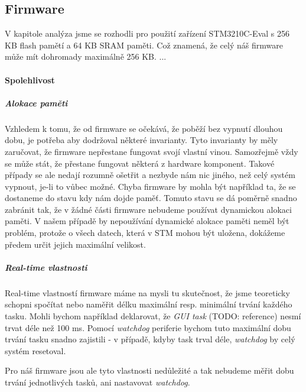 
\subsection{Firmware}

V kapitole analýza jsme se rozhodli pro použití zařízení STM3210C-Eval s 256 KB flash pamětí
a 64 KB SRAM paměti.
Což znamená, že celý náš firmware může mít dohromady maximálně 256 KB.
...

\paragraph{Spolehlivost}

\subparagraph{Alokace paměti}
Vzhledem k tomu, že od firmware se očekává, že poběží bez vypnutí dlouhou dobu, je potřeba aby
dodržoval některé invarianty.
Tyto invarianty by měly zaručovat, že firmware nepřestane fungovat svojí vlastní vinou.
Samozřejmě vždy se může stát, že přestane fungovat některá z hardware komponent.
Takové případy se ale nedají rozumně ošetřit a nezbyde nám nic jiného, než celý systém vypnout,
je-li to vůbec možné.
Chyba firmware by mohla být například ta, že se dostaneme do stavu kdy nám dojde paměť.
Tomuto stavu se dá poměrně snadno zabránit tak, že v žádné části firmware nebudeme používat
dynamickou alokaci paměti.
V našem případě by nepoužívání dynamické alokace paměti neměl být problém, protože o všech datech,
která v STM mohou být uložena, dokážeme předem určit jejich maximální velikost.

\subparagraph{Real-time vlastnosti}
Real-time vlastností firmware máme na mysli tu skutečnost, že jsme teoreticky schopni spočítat nebo
naměřit délku maximální resp. minimální trvání každého tasku.
Mohli bychom například deklarovat, že \emph{GUI task} (TODO: reference) nesmí trvat déle než
100 ms.
Pomocí \emph{watchdog} periferie bychom tuto maximální dobu trvání tasku snadno zajistili - v
případě, kdyby task trval déle, \emph{watchdog} by celý systém resetoval.

Pro náš firmware jsou ale tyto vlastnosti nedůležité a tak nebudeme měřit dobu trvání jednotlivých
tasků, ani nastavovat \emph{watchdog}.


